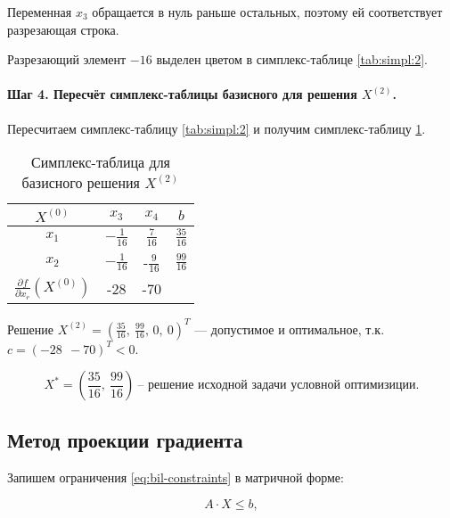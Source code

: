 Переменная $x_3$ обращается в нуль раньше остальных, поэтому ей соответствует разрезающая строка.

Разрезающий элемент $-16$ выделен цветом в симплекс-таблице \ref{tab:simpl:2}. 

\paragraph{Шаг 4. Пересчёт симплекс-таблицы базисного для решения $X^{(2)}$.}

Пересчитаем симплекс-таблицу \ref{tab:simpl:2} и получим симплекс-таблицу \ref{tab:simpl:3}.

\begin{table}[H]
\begin{center}
	\caption{Симплекс-таблица для базисного решения $X^{(2)}$}
	\label{tab:simpl:3}
	\def\tabcolsep{18pt}
	\def\arraystretch{1.5}
	\fontsize{13}{14}\selectfont
	\begin{tabular}{|c|c|c|c|}
		\hline 
		$X^{(0)}$ & $x_3$ & $x_4$ & $b$ \\ 
		\hline
		$x_1$ & $-\frac{1}{16}$ & $\frac{7}{16}$ & \cellcolor{green} $\frac{35}{16}$ \\ 
		\hline
		$x_2$ & $-\frac{1}{16}$ & -$\frac{9}{16}$ & \cellcolor{green} $\frac{99}{16}$ \\ 
		\hline
		$\frac{\partial f}{\partial x_r} \left(X^{(0)} \right)$ & -28 & -70 &  \\ 
		\hline 
	\end{tabular} 
\end{center}
\end{table}


Решение $X^{(2)} = \left(\frac{35}{16},\ \frac{99}{16} ,\, 0,\ 0\right)^T$ --- допустимое и оптимальное, т.к. $c = (-28\ \ -70)^T < 0$.

\begin{equation*}
	X^* = \left(\frac{35}{16},\ \frac{99}{16} \right)\ \text{-- решение исходной задачи условной оптимизиции.}
\end{equation*}

\subsection{Метод проекции градиента}

Запишем ограничения \ref{eq:bil-constraints} в матричной форме:

\begin{equation*}
	A \cdot X \leq b, 
\end{equation*}

